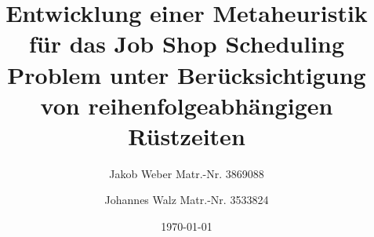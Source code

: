 \documentclass[
    ieee, %
    report, %
    german, %
    singlepage %
]{ohm}
\title{Entwicklung einer Metaheuristik für das Job Shop Scheduling Problem unter Berücksichtigung von reihenfolgeabhängigen Rüstzeiten}
\author{Jakob Weber Matr.-Nr. 3869088}
\author{Johannes Walz Matr.-Nr. 3533824}
\date{\today}
\begin{document}
\maketitle
\makeacknowledgements
\makeabstract
\maketableofcontents
\makeacronyms




%
%
\listoffigures
\listoflistings
\listoftables
\makelexicon
\makebibliography
%
\end{document}
